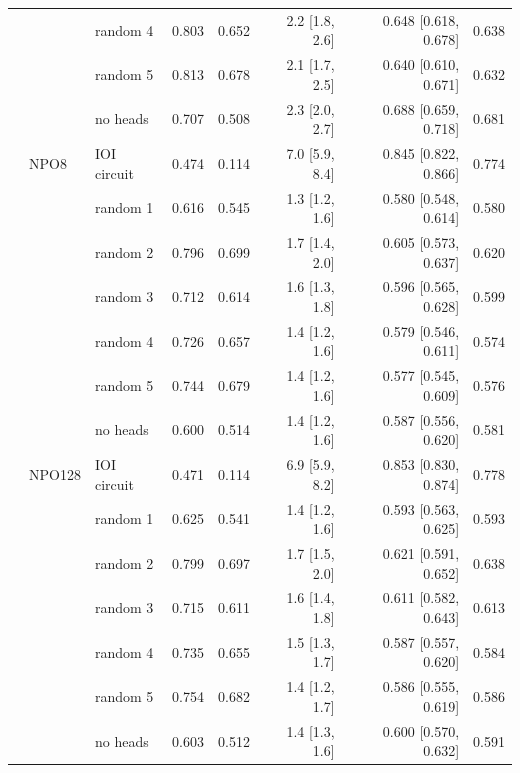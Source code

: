 \begin{tabular}{@{}lllrrrrr@{}}
 &  & random 4 & 0.803 & 0.652 & 2.2 [1.8, 2.6] & 0.648 [0.618, 0.678] & 0.638 \\
 &  & random 5 & 0.813 & 0.678 & 2.1 [1.7, 2.5] & 0.640 [0.610, 0.671] & 0.632 \\
 &  & no heads & 0.707 & 0.508 & 2.3 [2.0, 2.7] & 0.688 [0.659, 0.718] & 0.681 \\
\addlinespace[2pt]
 & NPO8 & IOI circuit & 0.474 & 0.114 & 7.0 [5.9, 8.4] & 0.845 [0.822, 0.866] & 0.774 \\
 &  & random 1 & 0.616 & 0.545 & 1.3 [1.2, 1.6] & 0.580 [0.548, 0.614] & 0.580 \\
 &  & random 2 & 0.796 & 0.699 & 1.7 [1.4, 2.0] & 0.605 [0.573, 0.637] & 0.620 \\
 &  & random 3 & 0.712 & 0.614 & 1.6 [1.3, 1.8] & 0.596 [0.565, 0.628] & 0.599 \\
 &  & random 4 & 0.726 & 0.657 & 1.4 [1.2, 1.6] & 0.579 [0.546, 0.611] & 0.574 \\
 &  & random 5 & 0.744 & 0.679 & 1.4 [1.2, 1.6] & 0.577 [0.545, 0.609] & 0.576 \\
 &  & no heads & 0.600 & 0.514 & 1.4 [1.2, 1.6] & 0.587 [0.556, 0.620] & 0.581 \\
\addlinespace[2pt]
 & NPO128 & IOI circuit & 0.471 & 0.114 & 6.9 [5.9, 8.2] & 0.853 [0.830, 0.874] & 0.778 \\
 &  & random 1 & 0.625 & 0.541 & 1.4 [1.2, 1.6] & 0.593 [0.563, 0.625] & 0.593 \\
 &  & random 2 & 0.799 & 0.697 & 1.7 [1.5, 2.0] & 0.621 [0.591, 0.652] & 0.638 \\
 &  & random 3 & 0.715 & 0.611 & 1.6 [1.4, 1.8] & 0.611 [0.582, 0.643] & 0.613 \\
 &  & random 4 & 0.735 & 0.655 & 1.5 [1.3, 1.7] & 0.587 [0.557, 0.620] & 0.584 \\
 &  & random 5 & 0.754 & 0.682 & 1.4 [1.2, 1.7] & 0.586 [0.555, 0.619] & 0.586 \\
 &  & no heads & 0.603 & 0.512 & 1.4 [1.3, 1.6] & 0.600 [0.570, 0.632] & 0.591 \\
\bottomrule
\end{tabular}
